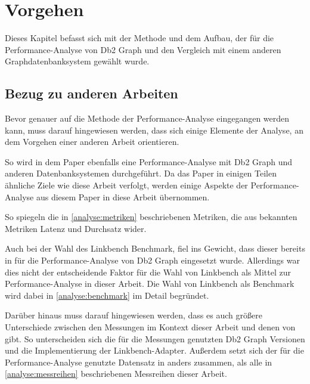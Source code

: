 \chapter{Vorgehen}
\label{vorgehen}
Dieses Kapitel befasst sich mit der Methode und dem Aufbau, der für die Performance-Analyse von Db2 Graph und den Vergleich mit einem anderen Graphdatenbanksystem gewählt wurde. 

\section{Bezug zu anderen Arbeiten}
Bevor genauer auf die Methode der Performance-Analyse eingegangen werden kann, muss darauf hingewiesen werden, dass sich einige Elemente der Analyse, an dem Vorgehen einer anderen Arbeit orientieren. 

So wird in dem Paper \cite{sigmod_tian} ebenfalls eine Performance-Analyse mit Db2 Graph und anderen Datenbanksystemen durchgeführt. Da das Paper \cite{sigmod_tian} in einigen Teilen ähnliche Ziele wie diese Arbeit verfolgt, werden einige Aspekte der Performance-Analyse aus diesem Paper in diese Arbeit übernommen. 

So spiegeln die in \autoref{analyse:metriken} beschriebenen Metriken, die aus \cite{sigmod_tian} bekannten Metriken Latenz und Durchsatz wider.

Auch bei der Wahl des Linkbench Benchmark, fiel ins Gewicht, dass dieser bereits in \cite{sigmod_tian} für die Performance-Analyse von Db2 Graph eingesetzt wurde. Allerdings war dies nicht der entscheidende Faktor für die Wahl von Linkbench als Mittel zur Performance-Analyse in dieser Arbeit. Die Wahl von Linkbench als Benchmark wird dabei in \autoref{analyse:benchmark} im Detail begründet. 

Darüber hinaus muss darauf hingewiesen werden, dass es auch größere Unterschiede zwischen den Messungen im Kontext dieser Arbeit und denen von \cite{sigmod_tian} gibt. So unterscheiden sich die für die Messungen genutzten Db2 Graph Versionen und die Implementierung der Linkbench-Adapter. Außerdem setzt sich der für die Performance-Analyse genutzte Datensatz in \cite{sigmod_tian} anders zusammen, als alle in \autoref{analyse:messreihen} beschriebenen Messreihen dieser Arbeit.

